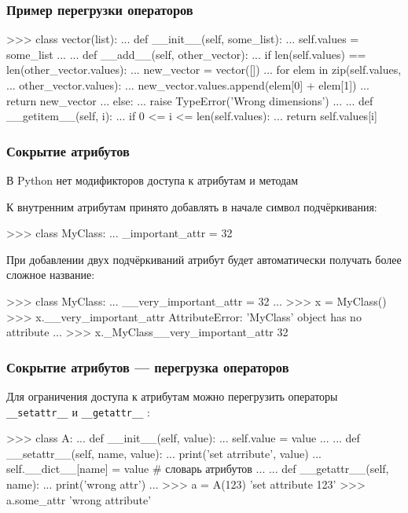 \documentclass[fleqn, xcolor=x11names, 11pt]{beamer}
\begin{document}
\begin{frame}[fragile]\frametitle{Пример перегрузки операторов}
\begin{pcode}
>>> class vector(list):
...    def __init__(self, some_list):
...        self.values = some_list
...    
...    def __add__(self, other_vector):
...        if len(self.values) == len(other_vector.values):
...            new_vector = vector([])
...            for elem in zip(self.values,
...                               other_vector.values):
...                new_vector.values.append(elem[0] + elem[1])
...            return new_vector
...        else:
...            raise TypeError('Wrong dimensions')
...            
...    def __getitem__(self, i):
...        if 0 <= i <= len(self.values):
...            return self.values[i]
\end{pcode}
\end{frame}

\begin{frame}[fragile]\frametitle{Сокрытие атрибутов}
В Python нет модификторов доступа к атрибутам и методам

\hfill

К внутренним атрибутам принято добавлять в начале символ подчёркивания:

\begin{pcode}
>>> class MyClass:
...    _important_attr = 32
\end{pcode}

\hfill

При добавлении двух подчёркиваний атрибут будет автоматически получать более сложное название:

\begin{pcode}
>>> class MyClass:
...    __very_important_attr = 32
...
>>> x = MyClass()
>>> x.__very_important_attr 
AttributeError: 'MyClass' object has no attribute ...
>>> x._MyClass__very_important_attr 
32
\end{pcode}


\end{frame}



\begin{frame}[fragile]\frametitle{Сокрытие атрибутов --- перегрузка операторов}
Для ограничения доступа к атрибутам можно перегрузить операторы  \texttt{__setattr__} и \texttt{__getattr__}  :
\begin{pcode}
>>> class A:
...    def __init__(self, value):
...        self.value = value
...
...    def __setattr__(self, name, value):
...        print('set atrribute', value)
...        self.__dict__[name] = value # словарь атрибутов
...
...    def __getattr__(self, name):
...        print('wrong attr')
...       
>>> a = A(123)
'set attribute 123'
>>> a.some_attr
'wrong attribute'
\end{pcode}


\end{frame}
\end{document}
